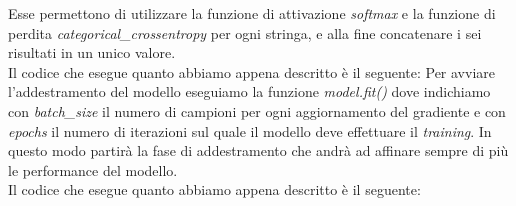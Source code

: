 Esse permettono di utilizzare la funzione di attivazione \textit{softmax} e la funzione di perdita \textit{categorical\_crossentropy} per ogni stringa, e alla fine concatenare i sei risultati in un unico valore.\\
\newline
Il codice che esegue quanto abbiamo appena descritto è il seguente:
\vspace*{2ex}
\vspace*{2ex}
\noindent Per avviare l'addestramento del modello eseguiamo la funzione \textit{model.fit()} dove indichiamo con \textit{batch\_size} il numero di campioni per ogni aggiornamento del gradiente e con \textit{epochs} il numero di iterazioni sul quale il modello deve effettuare il \textit{training}. In questo modo partirà la fase di addestramento che andrà ad affinare sempre di più le performance del modello.\\
\newline
Il codice che esegue quanto abbiamo appena descritto è il seguente:
\vspace*{2ex}
